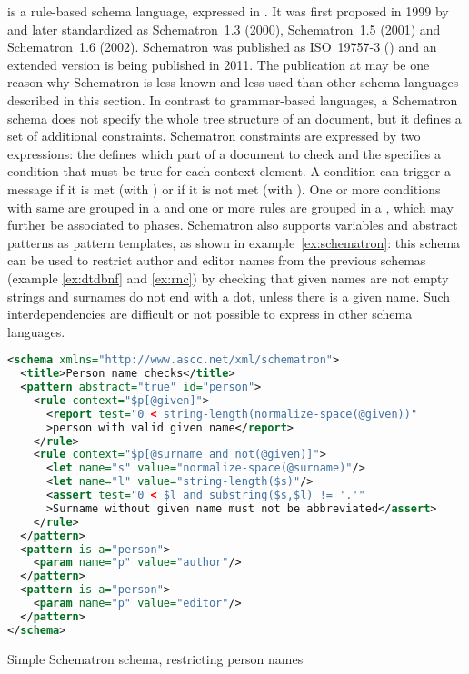  is a rule-based  schema language, expressed in
 \cite{VanDerVlist2007}. It was first proposed in 1999 by
 and later standardized as Schematron~1.3 (2000),
Schematron~1.5 (2001) and Schematron~1.6 (2002). Schematron was published as
ISO~19757-3 (\citeyear{ISO19757-3}) and an extended version is being published
in 2011. The publication at   may be one reason why Schematron is
less known and less used than other schema languages described in this section.
In contrast to grammar-based languages, a Schematron schema does not specify
the whole tree structure of an  document, but it defines a set of
additional constraints.  Schematron constraints are expressed by two
 expressions: the  defines which part of a document to
check and the  specifies a condition that must be true for each
context element. A condition can trigger a message if it is met (with
) or if it is not met (with ). One or more conditions
with same  are grouped in a  and one or more rules are
grouped in a , which may further be associated to phases.
Schematron also supports variables and abstract patterns as pattern templates,
as shown in example~\ref{ex:schematron}: this   schema can be
used to restrict author and editor names from the previous schemas (example
\ref{ex:dtdbnf} and \ref{ex:rnc}) by checking that given names are not empty
strings and surnames do not end with a dot, unless there is a given name.
Such interdependencies are difficult or not possible to express in
other schema languages.

\begin{example}
\begin{lstlisting}[language=XML]
<schema xmlns="http://www.ascc.net/xml/schematron">
  <title>Person name checks</title>
  <pattern abstract="true" id="person">
    <rule context="$p[@given]">
      <report test="0 < string-length(normalize-space(@given))"
      >person with valid given name</report>
    </rule>
    <rule context="$p[@surname and not(@given)]">
      <let name="s" value="normalize-space(@surname)"/>
      <let name="l" value="string-length($s)"/>
      <assert test="0 < $l and substring($s,$l) != '.'"
      >Surname without given name must not be abbreviated</assert>
    </rule>
  </pattern>
  <pattern is-a="person">
    <param name="p" value="author"/>
  </pattern>
  <pattern is-a="person">
    <param name="p" value="editor"/>
  </pattern>
</schema> 
\end{lstlisting}
\caption{Simple Schematron schema, restricting person names}
\label{ex:schematron}
\end{example}


